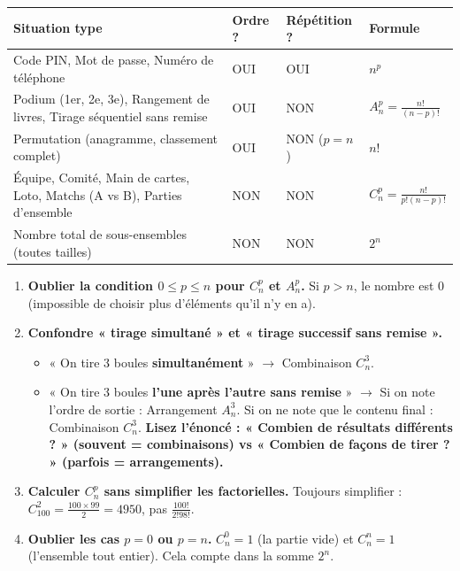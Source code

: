 \documentclass[11pt]{article}
\begin{document}
\begin{center}
\begin{tabularx}{\linewidth}{|l|X|X|X|}\hline
\rowcolor{popblueL}
\textbf{Situation type} & \textbf{Ordre ?} & \textbf{Répétition ?} & \textbf{Formule} \\ \hline
Code PIN, Mot de passe, Numéro de téléphone & OUI & OUI & $n^p$ \\ \hline
Podium (1er, 2e, 3e), Rangement de livres, Tirage séquentiel sans remise & OUI & NON & $A_n^p = \frac{n!}{(n-p)!}$ \\ \hline
Permutation (anagramme, classement complet) & OUI & NON ($p=n$) & $n!$ \\ \hline
Équipe, Comité, Main de cartes, Loto, Matchs (A vs B), Parties d'ensemble & NON & NON & $C_n^p = \frac{n!}{p!(n-p)!}$ \\ \hline
Nombre total de sous-ensembles (toutes tailles) & NON & NON & $2^n$ \\ \hline
\end{tabularx}
\end{center}

\begin{attention}
\begin{enumerate}
    \item \textbf{Oublier la condition $0 \le p \le n$ pour $C_n^p$ et $A_n^p$.} Si $p > n$, le nombre est $0$ (impossible de choisir plus d'éléments qu'il n'y en a).
    \item \textbf{Confondre « tirage simultané » et « tirage successif sans remise ».}
    \begin{itemize}
        \item « On tire 3 boules \textbf{simultanément} » $\rightarrow$ Combinaison $C_n^3$.
        \item « On tire 3 boules \textbf{l'une après l'autre sans remise} » $\rightarrow$ Si on note l'ordre de sortie : Arrangement $A_n^3$. Si on ne note que le contenu final : Combinaison $C_n^3$. \textbf{Lisez l'énoncé : « Combien de résultats différents ? » (souvent = combinaisons) vs « Combien de façons de tirer ? » (parfois = arrangements).}
    \end{itemize}
    \item \textbf{Calculer $C_n^p$ sans simplifier les factorielles.} Toujours simplifier : $C_{100}^2 = \frac{100 \times 99}{2} = 4950$, pas $\frac{100!}{2!98!}$.
    \item \textbf{Oublier les cas $p=0$ ou $p=n$.} $C_n^0 = 1$ (la partie vide) et $C_n^n = 1$ (l'ensemble tout entier). Cela compte dans la somme $2^n$.
\end{enumerate}
\end{attention}
\end{document}
